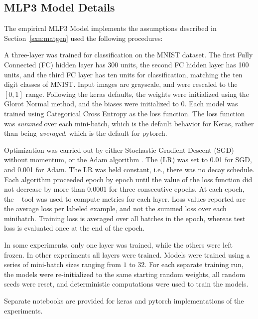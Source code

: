 

\subsection{MLP3 Model Details}
\label{sxn:appendix_MLP3details}
The empirical MLP3 Model implements the assumptions described in Section~\ref{sxn:matgen} used the following 
procedures:

A three-layer \MultiLayerPerceptron was trained for classification on the MNIST dataset\cite{MNIST1998}. The first Fully 
Connected (FC) hidden layer has 300 units, the second FC hidden layer has 100 units, and the third FC layer has ten 
units for classification, matching the ten digit classes of MNIST. Input images are grayscale, and were rescaled to the 
$[0, 1]$ range. Following the keras\cite{keras2015} defaults, the weights were initialized using the Glorot 
Normal\cite{GloBen10} method, and the biases were initialized to $0$. Each model was trained using Categorical Cross 
Entropy as the loss function. The loss function was {\em summed} over each mini-batch, which is the default behavior for 
Keras, rather than being {\em averaged}, which is the default for pytorch\cite{pytorch2019}. 

Optimization was carried out by either Stochastic Gradient Descent (SGD) 
without momentum, or the Adam algorithm \cite{kingma2014_TR}. The \LearningRate (LR) was set to 0.01 for SGD, and 0.001 
for Adam. The LR was held constant, i.e., there was no decay schedule. Each algorithm proceeded epoch by epoch until the 
value of the loss function did not decrease by more than 0.0001 for three consecutive epochs. At each epoch, 
the \WW~ tool was used to compute metrics for each layer. Loss values reported are the average loss per labeled example, 
and not the summed loss over each minibatch. Training loss is averaged over all batches in the epoch, whereas test loss 
is evaluated once at the end of the epoch.

In some experiments, only one layer was trained, while the others were left frozen. In other experiments all layers were 
trained. Models were trained using a series of mini-batch sizes ranging from $1$ to $32$. For each separate training 
run, the models were re-initialized to the same starting random weights, all random seeds were reset, and deterministic 
computations were used to train the models.

Separate notebooks are provided for keras and pytorch implementations of the experiments.


